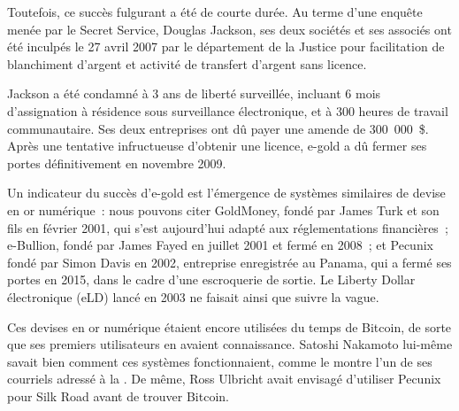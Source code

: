 Toutefois, ce succès fulgurant a été de courte durée. Au terme d'une enquête menée par le Secret Service, Douglas Jackson, ses deux sociétés et ses associés ont été inculpés le 27 avril 2007 par le département de la Justice pour facilitation de blanchiment d'argent et activité de transfert d'argent sans licence.

Jackson a été condamné à 3 ans de liberté surveillée, incluant 6 mois d'assignation à résidence sous surveillance électronique, et à 300 heures de travail communautaire. Ses deux entreprises ont dû payer une amende de 300~000~\$. Après une tentative infructueuse d'obtenir une licence, e-gold a dû fermer ses portes définitivement en novembre 2009.

Un indicateur du succès d'e-gold est l'émergence de systèmes similaires de devise en or numérique~: nous pouvons citer GoldMoney, fondé par James Turk et son fils en février 2001, qui s'est aujourd'hui adapté aux réglementations financières~; e-Bullion, fondé par James Fayed en juillet 2001 et fermé en 2008~; et Pecunix fondé par Simon Davis en 2002, entreprise enregistrée au Panama, qui a fermé ses portes en 2015, dans le cadre d'une escroquerie de sortie. Le Liberty Dollar électronique (eLD) lancé en 2003 ne faisait ainsi que suivre la vague.

Ces devises en or numérique étaient encore utilisées du temps de Bitcoin, de sorte que ses premiers utilisateurs en avaient connaissance. Satoshi Nakamoto lui-même savait bien comment ces systèmes fonctionnaient, comme le montre l'un de ses courriels adressé à la . De même, Ross Ulbricht avait envisagé d'utiliser Pecunix pour Silk Road avant de trouver Bitcoin.


